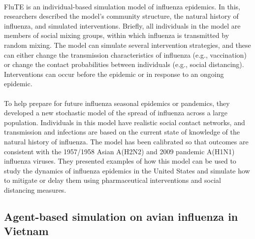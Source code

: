 \documentclass[14pt, a4paper]{extarticle}
\begin{document}
            \paragraph{} FluTE is an individual-based simulation model of influenza epidemics. In this, researchers described the model's community structure, the natural history of influenza, and simulated interventions. Briefly, all individuals in the model are members of social mixing groups, within which influenza is transmitted by random mixing. The model can simulate several intervention strategies, and these can either change the transmission characteristics of influenza (e.g., vaccination) or change the contact probabilities between individuals (e.g., social distancing). Interventions can occur before the epidemic or in response to an ongoing epidemic.

	        \paragraph{} To help prepare for future influenza seasonal epidemics or pandemics, they developed a new stochastic model of the spread of influenza across a large population. Individuals in this model have realistic social contact networks, and transmission and infections are based on the current state of knowledge of the natural history of influenza. The model has been calibrated so that outcomes are consistent with the 1957/1958 Asian A(H2N2) and 2009 pandemic A(H1N1) influenza viruses. They presented examples of how this model can be used to study the dynamics of influenza epidemics in the United States and simulate how to mitigate or delay them using pharmaceutical interventions and social distancing measures.
            
        \subsection{Agent-based simulation on avian influenza in Vietnam}
\end{document}
